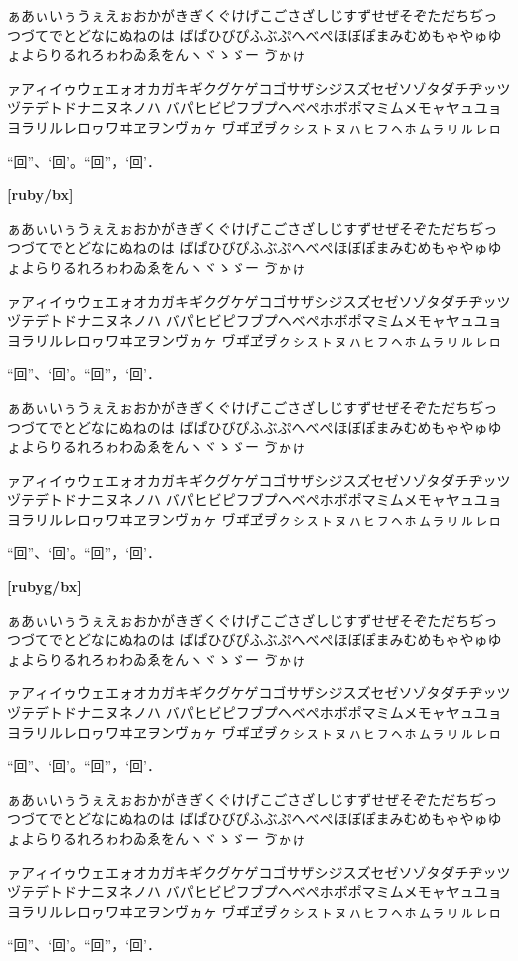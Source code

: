 \documentclass[a4paper,titlepage, draft,dvipdfmx]{\class}
\begin{document}
{\rubyfamily%
[ruby/m]

ぁあぃいぅうぇえぉおかがきぎくぐけげこごさざしじすずせぜそぞただちぢっつづてでとどなにぬねのは
ばぱひびぴふぶぷへべぺほぼぽまみむめもゃやゅゆょよらりるれろゎわゐゑをんヽヾゝゞー
\ifuptexmode
ゔゕゖ𛄲



\fi

ァアィイゥウェエォオカガキギクグケゲコゴサザシジスズセゼソゾタダチヂッツヅテデトドナニヌネノハ
バパヒビピフブプヘベペホボポマミムメモャヤュユョヨラリルレロヮワヰヱヲンヴヵヶ
\ifuptexmode
ヷヸヹヺㇰㇱㇲㇳㇴㇵㇶㇷㇸㇹㇺㇻㇼㇽㇾㇿ𛅕
\fi

“回”、‘回’。“回”，‘回’．

{\bfseries%
[ruby/bx]

ぁあぃいぅうぇえぉおかがきぎくぐけげこごさざしじすずせぜそぞただちぢっつづてでとどなにぬねのは
ばぱひびぴふぶぷへべぺほぼぽまみむめもゃやゅゆょよらりるれろゎわゐゑをんヽヾゝゞー
\ifuptexmode
ゔゕゖ𛄲
\fi

ァアィイゥウェエォオカガキギクグケゲコゴサザシジスズセゼソゾタダチヂッツヅテデトドナニヌネノハ
バパヒビピフブプヘベペホボポマミムメモャヤュユョヨラリルレロヮワヰヱヲンヴヵヶ
\ifuptexmode
ヷヸヹヺㇰㇱㇲㇳㇴㇵㇶㇷㇸㇹㇺㇻㇼㇽㇾㇿ𛅕
\fi

“回”、‘回’。“回”，‘回’．
}}

{\gtfamily\rubyfamily%
[rubyg/m]

ぁあぃいぅうぇえぉおかがきぎくぐけげこごさざしじすずせぜそぞただちぢっつづてでとどなにぬねのは
ばぱひびぴふぶぷへべぺほぼぽまみむめもゃやゅゆょよらりるれろゎわゐゑをんヽヾゝゞー
\ifuptexmode
ゔゕゖ𛄲
\fi

ァアィイゥウェエォオカガキギクグケゲコゴサザシジスズセゼソゾタダチヂッツヅテデトドナニヌネノハ
バパヒビピフブプヘベペホボポマミムメモャヤュユョヨラリルレロヮワヰヱヲンヴヵヶ
\ifuptexmode
ヷヸヹヺㇰㇱㇲㇳㇴㇵㇶㇷㇸㇹㇺㇻㇼㇽㇾㇿ𛅕
\fi

“回”、‘回’。“回”，‘回’．

{\gtfamily\rubyfamily\bfseries%
[rubyg/bx]



ぁあぃいぅうぇえぉおかがきぎくぐけげこごさざしじすずせぜそぞただちぢっつづてでとどなにぬねのは
ばぱひびぴふぶぷへべぺほぼぽまみむめもゃやゅゆょよらりるれろゎわゐゑをんヽヾゝゞー
\ifuptexmode
ゔゕゖ𛄲
\fi

ァアィイゥウェエォオカガキギクグケゲコゴサザシジスズセゼソゾタダチヂッツヅテデトドナニヌネノハ
バパヒビピフブプヘベペホボポマミムメモャヤュユョヨラリルレロヮワヰヱヲンヴヵヶ
\ifuptexmode
ヷヸヹヺㇰㇱㇲㇳㇴㇵㇶㇷㇸㇹㇺㇻㇼㇽㇾㇿ𛅕
\fi

“回”、‘回’。“回”，‘回’．
}}

{\mgfamily\rubyfamily%
[rubymg/m]

ぁあぃいぅうぇえぉおかがきぎくぐけげこごさざしじすずせぜそぞただちぢっつづてでとどなにぬねのは
ばぱひびぴふぶぷへべぺほぼぽまみむめもゃやゅゆょよらりるれろゎわゐゑをんヽヾゝゞー
\ifuptexmode
ゔゕゖ𛄲
\fi

ァアィイゥウェエォオカガキギクグケゲコゴサザシジスズセゼソゾタダチヂッツヅテデトドナニヌネノハ
バパヒビピフブプヘベペホボポマミムメモャヤュユョヨラリルレロヮワヰヱヲンヴヵヶ
\ifuptexmode
ヷヸヹヺㇰㇱㇲㇳㇴㇵㇶㇷㇸㇹㇺㇻㇼㇽㇾㇿ𛅕
\fi

“回”、‘回’。“回”，‘回’．
}
\end{document}
